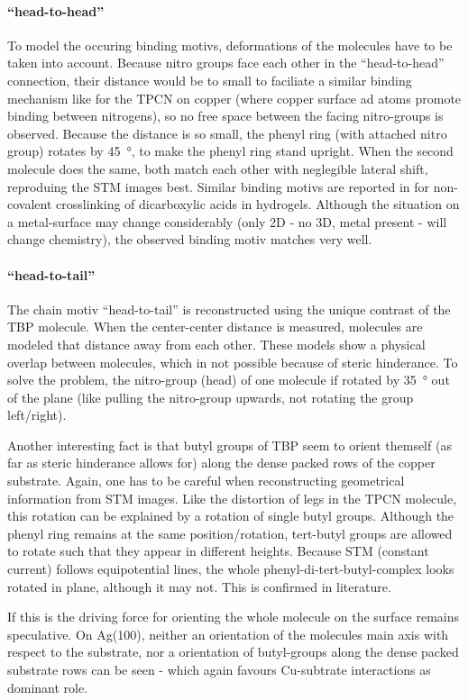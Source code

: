\paragraph{``head-to-head''}
To model the occuring binding motivs, deformations of the molecules have to be taken into account. Because nitro groups face each other in the ``head-to-head'' connection, their distance would be to small to faciliate a similar binding mechanism like for the TPCN on copper (where copper surface ad atoms promote binding between nitrogens), so no free space between the facing nitro-groups is observed. Because the distance is so small, the phenyl ring (with attached nitro group) rotates by \SI{45}{\degree}, to make the phenyl ring stand upright. When the second molecule does the same, both match each other with neglegible lateral shift, reproduing the STM images best. Similar binding motivs are reported in \cite{kato_dispersive_2008} for non-covalent crosslinking of dicarboxylic acids in hydrogels. Although the situation on a metal-surface may change considerably (only 2D - no 3D, metal present - will change chemistry), the observed binding motiv matches very well.

\paragraph{``head-to-tail''}
The chain motiv ``head-to-tail'' is reconstructed using the unique contrast of the TBP molecule. When the center-center distance is measured, molecules are modeled that distance away from each other. These models show a physical overlap between molecules, which in not possible because of steric hinderance. To solve the problem, the nitro-group (head) of one molecule if rotated by \SI{35}{\degree} out of the plane (like pulling the nitro-group upwards, not rotating the group left/right). 


Another interesting fact is that butyl groups of TBP seem to orient themself (as far as steric hinderance allows for) along the dense packed rows of the copper substrate. Again, one has to be careful when reconstructing geometrical information from STM images. Like the distortion of legs in the TPCN molecule, this rotation can be explained by a rotation of single butyl groups. Although the phenyl ring remains at the same position/rotation, tert-butyl groups are allowed to rotate such that they appear in different heights. Because STM (constant current) follows equipotential lines, the whole phenyl-di-tert-butyl-complex looks rotated in plane, although it may not. This is confirmed in literature\cite{heim_surface-assisted_2010,heim_self-assembly_2010}.

If this is the driving force for orienting the whole molecule on the surface remains speculative. On Ag(100), neither an orientation of the molecules main axis with respect to the substrate, nor a orientation of butyl-groups along the dense packed substrate rows can be seen - which again favours Cu-subtrate interactions as dominant role.